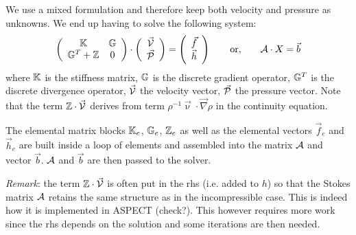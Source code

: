 We use a mixed formulation and therefore keep both velocity and pressure as unknowns. 
We end up having to solve the following system:
\[
\left(
\begin{array}{cc}
{\mathbb{K}} & {\mathbb{G}} \\ {\mathbb{G}}^T+{\mathbb{Z}} & 0 
\end{array}
\right)
\cdot
\left(
\begin{array}{c}
\vec{\cal V} \\ \vec{\cal P}
\end{array}
\right)
=
\left(
\begin{array}{c}
\vec{f} \\ \vec{h}
\end{array}
\right)
\quad\quad
{\rm or,}
\quad\quad
{\cal A} \cdot X = \vec{b}
\]
where ${\mathbb{K}}$ is the stiffness matrix, ${\mathbb{G}}$ is the discrete gradient operator, 
${\mathbb{G}}^T$ is the discrete divergence operator, $\vec{\cal V}$ the velocity vector, 
$\vec{\cal P}$ the pressure vector.
Note that the term ${\mathbb{Z}}\cdot \vec{\cal V}$ derives from term $\rho^{-1} \vec{\upnu} \cdot \vec{\nabla}\rho$ 
in the continuity equation. 

The elemental matrix blocks ${\mathbb{K}}_e$, ${\mathbb{G}}_e$, ${\mathbb{Z}}_e$ as well as 
the elemental vectors $\vec{f}_e$ and $\vec{h}_e$ are built inside a 
loop of elements and assembled into the matrix ${\cal A}$ and vector $\vec{b}$. 
${\cal A}$ and $\vec{b}$ are then passed to the solver. 

{\sl Remark}: the term ${\mathbb{Z}}\cdot \vec{\cal V}$ is often put in the rhs (i.e. added to $h$) so that 
the Stokes matrix ${\cal A}$ retains the same structure as in the incompressible case. This is indeed 
how it is implemented in ASPECT (check?). This however requires more work since the rhs depends 
on the solution and some iterations are then needed. 

